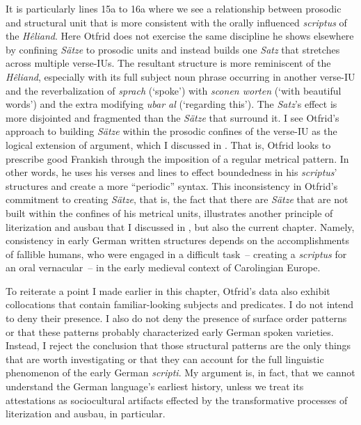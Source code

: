 It is particularly lines 15a to 16a where we see a relationship between prosodic and structural unit that is more consistent with the orally influenced \textit{scriptus} of the \textit{Hêliand}. Here Otfrid does not exercise the same discipline he shows elsewhere by confining \textit{Sätze} to prosodic units and instead builds one \textit{Satz} that stretches across multiple verse-IUs. The resultant structure is more reminiscent of the \textit{Hêliand}, especially with its full subject noun phrase occurring in another verse-IU and the reverbalization of \textit{sprach} (‘spoke') with \textit{sconen worten} (‘with beautiful words') and the extra modifying \textit{ubar al} (‘regarding this'). The \textit{Satz}’s effect is more disjointed and fragmented than the \textit{Sätze} that surround it. I see Otfrid’s approach to building \textit{Sätze} within the prosodic confines of the verse-IU as the logical extension of  argument, which I discussed in . That is, Otfrid looks to prescribe good Frankish through the imposition of a regular metrical pattern. In other words, he uses his verses and lines to effect boundedness in his \textit{scriptus}’ structures and create a more “periodic” syntax. This inconsistency in Otfrid’s commitment to creating \textit{Sätze}, that is, the fact that there are \textit{Sätze} that are not built within the confines of his metrical units, illustrates another principle of literization and ausbau that I discussed in , but also the current chapter. Namely, consistency in early German written structures depends on the accomplishments of fallible humans, who were engaged in a difficult task~-- creating a \textit{scriptus} for an oral vernacular~-- in the early medieval context of Carolingian Europe.

To reiterate a point I made earlier in this chapter, Otfrid’s data also exhibit collocations that contain familiar-looking subjects and predicates. I do not intend to deny their presence. I also do not deny the presence of surface order patterns or that these patterns probably characterized early German spoken varieties. Instead, I reject the conclusion that those structural patterns are the only things that are worth investigating or that they can account for the full linguistic phenomenon of the early German \textit{scripti}. My argument is, in fact, that we cannot understand the German language’s earliest history, unless we treat its attestations as sociocultural artifacts effected by the transformative processes of literization and ausbau, in particular.

